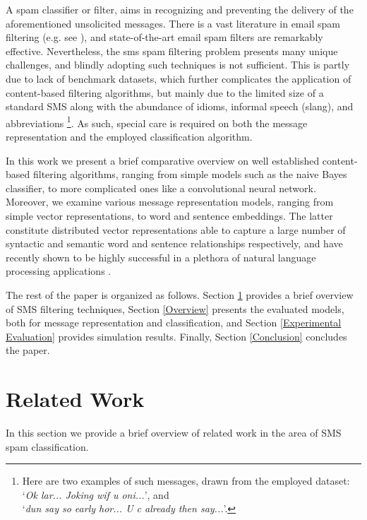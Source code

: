 \documentclass[letterpaper]{article}
\begin{document}
A spam classifier or filter, aims in recognizing and preventing the delivery of the aforementioned unsolicited messages. There is a vast literature in email spam filtering (e.g. see \cite{cormack2008email} \cite{blanzieri2008survey}), and state-of-the-art email spam filters are remarkably effective. Nevertheless, the sms spam filtering problem presents many unique challenges, and blindly adopting such techniques is not sufficient. This is partly due to lack of benchmark datasets, which further complicates the application of content-based filtering algorithms, but mainly due to the limited size of a standard SMS along with the abundance of idioms, informal speech (slang), and abbreviations \footnote{Here are two examples of such messages, drawn from the employed dataset: `\emph{Ok lar... Joking wif u oni...}', and \\ `\emph{dun say so early hor... U c already then say...}'.}. As such, special care is required on both the message representation and the employed classification algorithm.

In this work we present a brief comparative overview on well established content-based filtering algorithms, ranging from simple models such as the naive Bayes classifier, to more complicated ones like a convolutional neural network. Moreover, we examine various message representation models, ranging from simple vector representations, to word and sentence embeddings. The latter constitute distributed vector representations able to capture a large number of syntactic and semantic word and sentence relationships respectively, and have recently shown to be highly successful in a plethora of natural language processing applications \cite{mikolov2013distributed} \cite{bojanowski2016enriching} \cite{pagliardini2017unsupervised}.

The rest of the paper is organized as follows. Section \ref{Related Work} provides a brief overview of SMS filtering techniques, Section \ref{Overview} presents the evaluated models, both for message representation and classification, and Section \ref{Experimental Evaluation} provides simulation results. Finally, Section \ref{Conclusion} concludes the paper.

\section{Related Work} \label{Related Work}

In this section we provide a brief overview of related work in the area of SMS spam classification.
\end{document}
